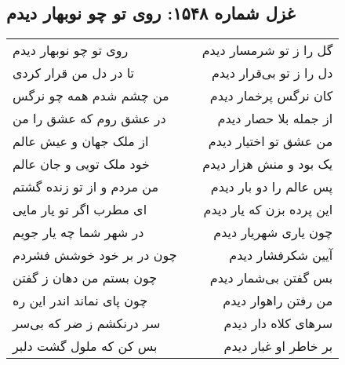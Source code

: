 \begin{center}
\section*{غزل شماره ۱۵۴۸: روی تو چو نوبهار دیدم}
\label{sec:1548}
\begin{longtable}{l p{0.5cm} r}
روی تو چو نوبهار دیدم
&&
گل را ز تو شرمسار دیدم
\\
تا در دل من قرار کردی
&&
دل را ز تو بی‌قرار دیدم
\\
من چشم شدم همه چو نرگس
&&
کان نرگس پرخمار دیدم
\\
در عشق روم که عشق را من
&&
از جمله بلا حصار دیدم
\\
از ملک جهان و عیش عالم
&&
من عشق تو اختیار دیدم
\\
خود ملک تویی و جان عالم
&&
یک بود و منش هزار دیدم
\\
من مردم و از تو زنده گشتم
&&
پس عالم را دو بار دیدم
\\
ای مطرب اگر تو یار مایی
&&
این پرده بزن که یار دیدم
\\
در شهر شما چه یار جویم
&&
چون یاری شهریار دیدم
\\
چون در بر خود خوشش فشردم
&&
آیین شکرفشار دیدم
\\
چون بستم من دهان ز گفتن
&&
بس گفتن بی‌شمار دیدم
\\
چون پای نماند اندر این ره
&&
من رفتن راهوار دیدم
\\
سر درنکشم ز ضر که بی‌سر
&&
سرهای کلاه دار دیدم
\\
بس کن که ملول گشت دلبر
&&
بر خاطر او غبار دیدم
\\
\end{longtable}
\end{center}
